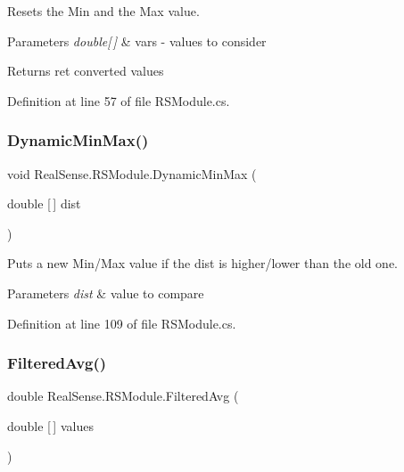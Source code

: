 Resets the Min and the Max value. 
\begin{DoxyParams}{Parameters}
{\em double\mbox{[}$\,$\mbox{]}} & vars -\/ values to consider \\
\hline
\end{DoxyParams}
\begin{DoxyReturn}{Returns}
ret converted values 
\end{DoxyReturn}


Definition at line 57 of file R\+S\+Module.\+cs.

\mbox{\label{class_real_sense_1_1_r_s_module_a654263c518b548bad34f5e6ce9c6d2c5}} 
\subsubsection{\texorpdfstring{Dynamic\+Min\+Max()}{DynamicMinMax()}}
{\footnotesize\ttfamily void Real\+Sense.\+R\+S\+Module.\+Dynamic\+Min\+Max (\begin{DoxyParamCaption}\item[{double \mbox{[}$\,$\mbox{]}}]{dist }\end{DoxyParamCaption})\hspace{0.3cm}{\ttfamily [protected]}}

Puts a new Min/\+Max value if the dist is higher/lower than the old one. 
\begin{DoxyParams}{Parameters}
{\em dist} & value to compare \\
\hline
\end{DoxyParams}


Definition at line 109 of file R\+S\+Module.\+cs.

\mbox{\label{class_real_sense_1_1_r_s_module_a60d15c600059346aae1effda4a1f9a82}} 
\subsubsection{\texorpdfstring{Filtered\+Avg()}{FilteredAvg()}}
{\footnotesize\ttfamily double Real\+Sense.\+R\+S\+Module.\+Filtered\+Avg (\begin{DoxyParamCaption}\item[{double \mbox{[}$\,$\mbox{]}}]{values }\end{DoxyParamCaption})\hspace{0.3cm}{\ttfamily [protected]}}

